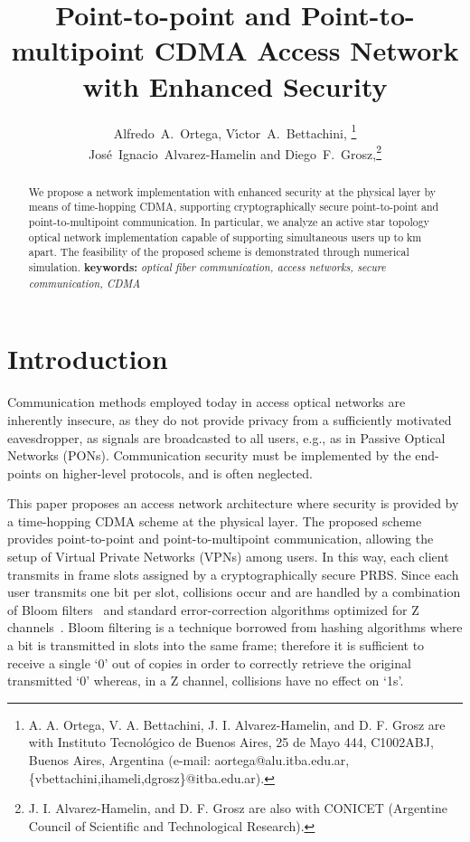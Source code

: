 \documentclass[10pt]{article}
\begin{document}
\title{Point-to-point and Point-to-multipoint CDMA Access Network with Enhanced Security}
\author{
  Alfredo~A.~Ortega,
  V\'{\i}ctor~A.~Bettachini,
  \thanks{A. A. Ortega, V. A. Bettachini, J. I. Alvarez-Hamelin, and D.
F. Grosz are with Instituto Tecnol\'ogico de Buenos Aires, 25 de Mayo
444, C1002ABJ, Buenos Aires, Argentina (e-mail: aortega@alu.itba.edu.ar,
\{vbettachini,ihameli,dgrosz\}@itba.edu.ar).}\\
  Jos\'e~Ignacio~Alvarez-Hamelin
  and Diego~F.~Grosz,\thanks{J. I. Alvarez-Hamelin, and D. F. Grosz are also with CONICET
(Argentine Council of Scientific and Technological Research).}
}
\maketitle
\begin{abstract}
We propose a network implementation with enhanced security at the physical layer by means of time-hopping CDMA, supporting cryptographically secure point-to-point and point-to-multipoint communication.
In particular, we analyze an active star topology optical network implementation capable of supporting  simultaneous users up to  km apart.
The feasibility of the proposed scheme is demonstrated through numerical simulation.
{\bf keywords:} {\em optical fiber communication, access networks,
secure communication, CDMA}
\end{abstract}
\section{Introduction}

Communication methods employed today in access optical
networks are inherently insecure, as they do not provide privacy from a
sufficiently motivated eavesdropper, as signals are broadcasted to all
users, e.g., as in Passive Optical Networks (PONs).
Communication security must be implemented by the end-points on higher-level protocols, and is often neglected.

This paper proposes an access network architecture where security is provided by a time-hopping CDMA scheme at the physical layer.
The proposed scheme provides point-to-point and point-to-multipoint
communication, allowing the setup of Virtual Private Networks (VPNs)
among users.
In this way, each client transmits in frame slots assigned by a
cryptographically secure PRBS.  Since each user transmits one bit per
slot, collisions occur and are
handled by a combination of Bloom
filters~\cite{Bloom70space/timetrade-offs} and
standard error-correction algorithms optimized for Z channels~\cite{Golomb:80}.
Bloom filtering is a technique borrowed from hashing algorithms where a
bit is transmitted in  slots into the same frame; therefore it is
sufficient to receive a single `0' out of  copies in order to
correctly retrieve the original transmitted `0' whereas, in a Z
channel, collisions have no effect on `1s'.
\end{document}
